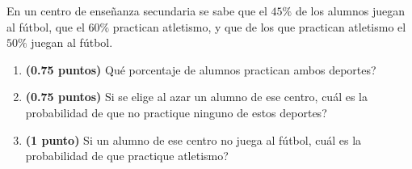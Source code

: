 
En un centro de enseñanza secundaria se sabe que el $45\%$ de los alumnos juegan al fútbol, que el $60\%$ practican atletismo, y que de los que practican atletismo el $50\%$ juegan al fútbol.
\begin{enumerate}[label=\alph*)]
\item \textbf{(0.75 puntos)} \textquestiondown{}Qué porcentaje de alumnos practican ambos deportes?
\item \textbf{(0.75 puntos)} Si se elige al azar un alumno de ese centro, \textquestiondown{}cuál es la probabilidad de que no practique ninguno de estos deportes?
\item \textbf{(1 punto)} Si un alumno de ese centro no juega al fútbol, \textquestiondown{}cuál es la probabilidad de que practique atletismo?
\end{enumerate}
